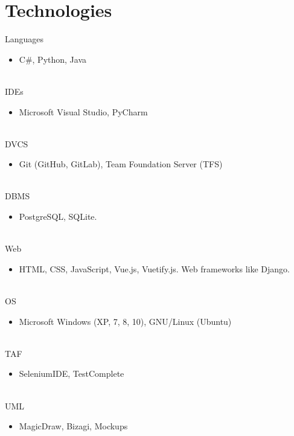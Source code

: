 \documentclass[letterpaper]{twentysecondcv} %
\begin{document}
\section{Technologies}
\begin{twenty}
	
	 \twentyitem
    	{Languages}
		{}
        {}
        {}
        {}
        {
        {\begin{itemize}
        \item C\#, Python, Java
		\end{itemize}}
        }
        \\
	\twentyitem
    	{IDEs}
		{}
        {}
        {}
        {}
        {
        {\begin{itemize}
        \item Microsoft Visual Studio, PyCharm
		\end{itemize}}
        }
        \\
        \twentyitem
    	{DVCS}
		{}
        {}
        {}
        {}
        {
        {\begin{itemize}
        \item Git (GitHub, GitLab), Team Foundation Server (TFS)
		\end{itemize}}
		}
		\\
        \twentyitem
	    {DBMS}
		{}
        {}
        {}
        {}
        {
        {\begin{itemize}
        \item PostgreSQL, SQLite.
		\end{itemize}}
		}
		\\
        \twentyitem
	    {Web}
		{}
        {}
        {}
        {}
        {
        {\begin{itemize}
        \item HTML, CSS, JavaScript, Vue.js, Vuetify.js. Web frameworks like Django.
		\end{itemize}}
		}
		\\
        \twentyitem
	    {OS}
		{}
        {}
        {}
        {}
        {
        {\begin{itemize}
        \item Microsoft Windows (XP, 7, 8, 10), GNU/Linux (Ubuntu)
		\end{itemize}}
		}
		\\
        \twentyitem
	    {TAF}
		{}
        {}
        {}
        {}
        {
        {\begin{itemize}
        \item SeleniumIDE, TestComplete
		\end{itemize}}
		}
		\\
        \twentyitem
	    {UML}
		{}
        {}
        {}
        {}
        {
        {\begin{itemize}
        \item MagicDraw, Bizagi, Mockups
		\end{itemize}}
		}
\end{twenty}
\end{document}
